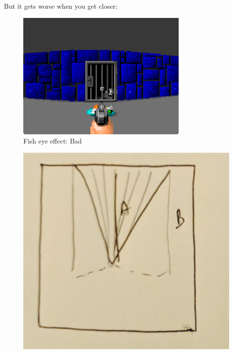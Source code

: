 But it gets worse when you get closer:
\begin{figure}[H]
\centering
 \includegraphics[width=\textwidth]{imgs/fish_eye/bad_ok.png}
 \caption{Fish eye effect: Bad} \label{fig:mips}
 \end{figure}
 \begin{figure}[H]
  \centering
 \includegraphics[width=.3\textwidth]{imgs/fish_eye/fish_eye_top_mid.png}
\end{figure}
\par


